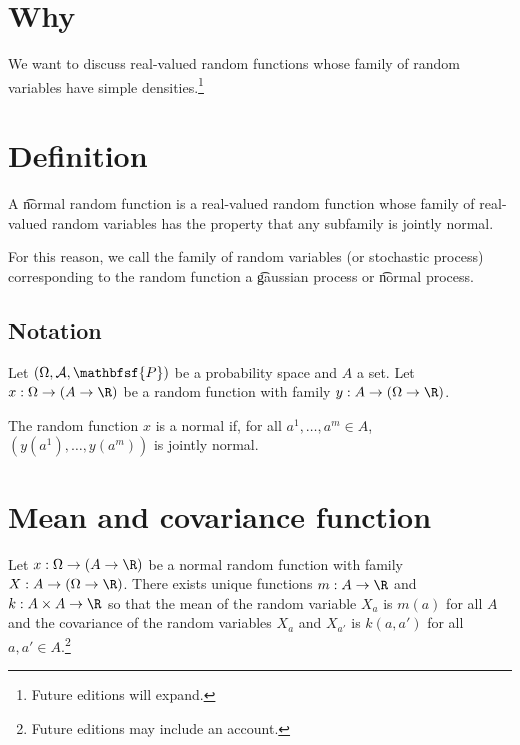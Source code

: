 
\section*{Why}

We want to discuss real-valued random functions whose family of random variables have simple densities.\footnote{Future editions will expand.}

\section*{Definition}

A \t{normal random function} is a real-valued random function whose family of real-valued random variables has the property that any subfamily is jointly normal.

For this reason, we call the family of random variables (or stochastic process) corresponding to the random function a \t{gaussian process} or \t{normal process}.

  \subsection*{Notation}

Let $(\Omega , \mathcal{A} , \mathbfsf{P} )$ be a probability space and $A$ a set.
Let $x: \Omega  \to (A \to \R )$ be a random function with family $y: A \to (\Omega  \to \R )$.

The random function $x$ is a normal if, for all $a^1, \dots , a^m \in A$, $(y(a^1), \dots , y(a^m))$ is jointly normal.

  \section*{Mean and covariance function}

\begin{proposition}
Let $x: \Omega  \to (A \to \R )$ be a normal random function with family $X: A \to (\Omega  \to \R )$.
There exists unique functions $m: A \to \R $ and $k: A \times A \to \R $ so that the mean of the random variable $X_a$ is $m(a)$ for all $A$ and the covariance of the random variables $X_a$ and $X_{a'}$ is $k(a, a')$ for all $a, a' \in A$.\footnote{Future editions may include an account.}
\end{proposition}

